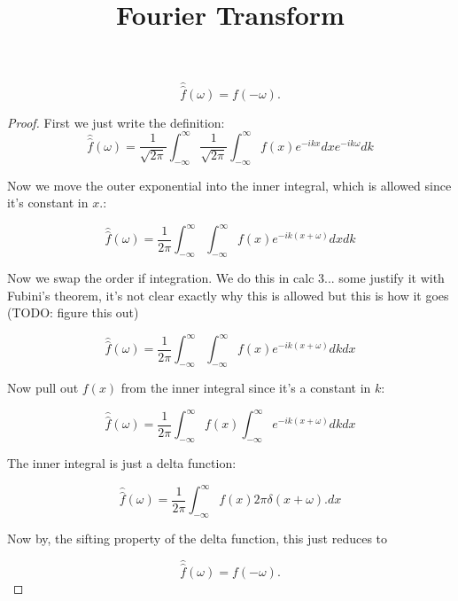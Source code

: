 \documentclass{article}
\title{Fourier Transform}
\begin{document}
\begin{theorem}
\[ \hat{\hat{f}}(\omega) = f(-\omega). \]
\end{theorem}

\begin{proof}
First we just write the definition:
\[ \hat{\hat{f}}(\omega) = \frac{1}{\sqrt{2 \pi}} \int_{-\infty}^{\infty}  \frac{1}{\sqrt{2 \pi}} \int_{-\infty}^{\infty} f(x) e^{- i k x} dx e^{-ik \omega} dk \]

Now we move the outer exponential into the inner integral, which is allowed since it's constant in $x.$:

\[ \hat{\hat{f}}(\omega) = \frac{1}{2 \pi} \int_{-\infty}^{\infty}  \int_{-\infty}^{\infty} f(x) e^{- i k (x + \omega )} dx dk \]

Now we swap the order if integration. We do this in calc 3... some justify it with Fubini's theorem, it's not clear exactly why this is allowed but this is how it goes (TODO: figure this out)

\[ \hat{\hat{f}}(\omega) = \frac{1}{2 \pi} \int_{-\infty}^{\infty}  \int_{-\infty}^{\infty} f(x) e^{- i k (x + \omega )} dk dx \]

Now pull out $f(x)$ from the inner integral since it's a constant in $k:$

\[ \hat{\hat{f}}(\omega) = \frac{1}{2 \pi} \int_{-\infty}^{\infty} f(x) \int_{-\infty}^{\infty} e^{- i k (x + \omega )} dk dx \]

The inner integral is just a delta function:

\[ \hat{\hat{f}}(\omega) = \frac{1}{2 \pi} \int_{-\infty}^{\infty} f(x) 2 \pi \delta(x + \omega). dx \]

Now by, the sifting property of the delta function, this just reduces to

\[ \hat{\hat{f}}(\omega) = f(-\omega). \]
\end{proof}
\end{document}
